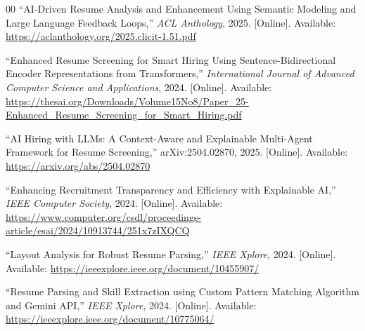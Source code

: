\documentclass[conference]{IEEEtran}
\begin{document}
\begin{thebibliography}{00}
 ``AI-Driven Resume Analysis and Enhancement Using Semantic Modeling and Large Language Feedback Loops,'' \textit{ACL Anthology}, 2025. [Online]. Available: \url{https://aclanthology.org/2025.clicit-1.51.pdf}

 ``Enhanced Resume Screening for Smart Hiring Using Sentence-Bidirectional Encoder Representations from Transformers,'' \textit{International Journal of Advanced Computer Science and Applications}, 2024. [Online]. Available: \url{https://thesai.org/Downloads/Volume15No8/Paper_25-Enhanced_Resume_Screening_for_Smart_Hiring.pdf}

 ``AI Hiring with LLMs: A Context-Aware and Explainable Multi-Agent Framework for Resume Screening,'' arXiv:2504.02870, 2025. [Online]. Available: \url{https://arxiv.org/abs/2504.02870}

 ``Enhancing Recruitment Transparency and Efficiency with Explainable AI,'' \textit{IEEE Computer Society}, 2024. [Online]. Available: \url{https://www.computer.org/csdl/proceedings-article/esai/2024/10913744/251x7zIXQCQ}

 ``Layout Analysis for Robust Resume Parsing,'' \textit{IEEE Xplore}, 2024. [Online]. Available: \url{https://ieeexplore.ieee.org/document/10455907/}

 ``Resume Parsing and Skill Extraction using Custom Pattern Matching Algorithm and Gemini API,'' \textit{IEEE Xplore}, 2024. [Online]. Available: \url{https://ieeexplore.ieee.org/document/10775064/}

\end{thebibliography}
\end{document}
